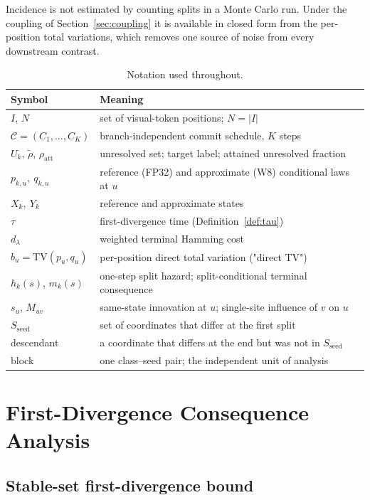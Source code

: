 \documentclass[11pt,a4paper]{article}
\theoremstyle{plain}
\theoremstyle{definition}
\theoremstyle{remark}
\newcommand{\TV}{\mathrm{TV}}
\newcommand{\rholabel}{\widetilde{\rho}}
\newcommand{\rhoatt}{\rho_{\mathrm{att}}}
\begin{document}
\medskip
Incidence is not estimated by counting splits in a Monte Carlo run. Under the
coupling of Section~\ref{sec:coupling} it is available in closed form from the
per-position total variations, which removes one source of noise from every
downstream contrast.

\begin{table}[t]
\centering
\caption{Notation used throughout.}
\label{tab:notation}
\small
\begin{tabular}{@{}ll@{}}
\toprule
Symbol & Meaning \\
\midrule
$I$, $N$ & set of visual-token positions; $N=|I|$ \\
$\mathcal{C}=(C_1,\dots,C_K)$ & branch-independent commit schedule, $K$ steps \\
$U_k$, $\rholabel$, $\rhoatt$ & unresolved set; target label; attained unresolved fraction \\
$p_{k,u},\ q_{k,u}$ & reference (FP32) and approximate (W8) conditional laws at $u$ \\
$X_k,\ Y_k$ & reference and approximate states \\
$\tau$ & first-divergence time (Definition~\ref{def:tau}) \\
$d_\lambda$ & weighted terminal Hamming cost \\
$b_u=\TV(p_u,q_u)$ & per-position direct total variation ("direct TV") \\
$h_k(s)$, $m_k(s)$ & one-step split hazard; split-conditional terminal consequence \\
$s_u$, $M_{uv}$ & same-state innovation at $u$; single-site influence of $v$ on $u$ \\
$S_{\mathrm{seed}}$ & set of coordinates that differ at the first split \\
descendant & a coordinate that differs at the end but was not in $S_{\mathrm{seed}}$ \\
block & one class--seed pair; the independent unit of analysis \\
\bottomrule
\end{tabular}
\end{table}

\section{First-Divergence Consequence Analysis}
\label{sec:theory}

\subsection{Stable-set first-divergence bound}
\end{document}
